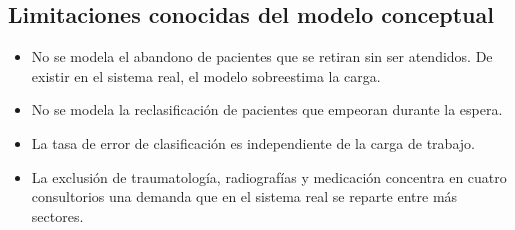 \subsection{Limitaciones conocidas del modelo conceptual}

\begin{itemize}
  \item No se modela el abandono de pacientes que se retiran sin ser
  atendidos. De existir en el sistema real, el modelo sobreestima la carga.
  \item No se modela la reclasificación de pacientes que empeoran durante la
  espera.
  \item La tasa de error de clasificación es independiente de la carga de
  trabajo.
  \item La exclusión de traumatología, radiografías y medicación concentra en
  cuatro consultorios una demanda que en el sistema real se reparte entre más
  sectores.
\end{itemize}


